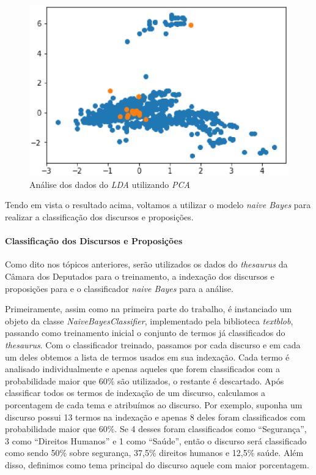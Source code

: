 \begin{figure}[h]
    \centering
    \includegraphics[scale=0.6]{figuras/pca.eps}
    \caption{Análise dos dados do \textit{LDA} utilizando \textit{PCA}}
\end{figure}

Tendo em vista o resultado acima, voltamos a utilizar o modelo \textit{naive Bayes} para realizar a classificação dos discursos e proposições.

\paragraph{Classificação dos Discursos e Proposições}

Como dito nos tópicos anteriores, serão utilizados os dados do \textit{thesaurus} da Câmara dos Deputados para o treinamento, a indexação dos discursos e proposições para e o classificador \textit{naive Bayes} para a análise.

Primeiramente, assim como na primeira parte do trabalho, é instanciado um objeto da classe \textit{NaiveBayesClassifier}, implementado pela biblioteca \textit{textblob}, passando como treinamento inicial o conjunto de termos já classificados do \textit{thesaurus}. Com o classificador treinado, passamos por cada discurso e em cada um deles obtemos a lista de termos usados em sua indexação. Cada termo é analisado individualmente e apenas aqueles que forem classificados com a probabilidade maior que 60\% são utilizados, o restante é descartado. Após classificar todos os termos de indexação de um discurso, calculamos a porcentagem de cada tema e atribuímos ao discurso. Por exemplo, suponha um discurso possui 13 termos na indexação e apenas 8 deles foram classificados com probabilidade maior que 60\%. Se 4 desses foram classificados como ``Segurança'', 3 como ``Direitos Humanos'' e 1 como ``Saúde'', então o discurso será classificado como sendo 50\% sobre segurança, 37,5\% direitos humanos e 12,5\% saúde. Além disso, definimos como tema principal do discurso aquele com maior porcentagem.

